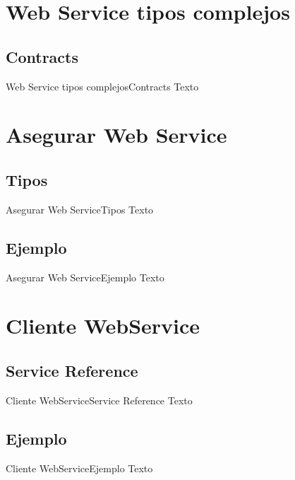 \documentclass[10pt]{beamer}
\begin{document}
\section{Web Service tipos complejos}
\subsection{Contracts}
\begin{frame}{Web Service tipos complejos}{Contracts}
	Texto
\end{frame}
\section{Asegurar Web Service}
\subsection{Tipos}
\begin{frame}{Asegurar Web Service}{Tipos}
	Texto
\end{frame}
\subsection{Ejemplo}
\begin{frame}{Asegurar Web Service}{Ejemplo}
	Texto
\end{frame}
\section{Cliente WebService}
\subsection{Service Reference}
\begin{frame}{Cliente WebService}{Service Reference}
	Texto
\end{frame}
\subsection{Ejemplo}
\begin{frame}{Cliente WebService}{Ejemplo}
	Texto
\end{frame}
\end{document}
